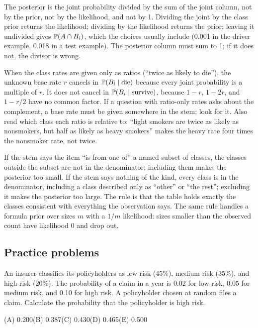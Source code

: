 \begin{trap}
The posterior is the joint probability divided by the sum of the joint column, not by the
prior, not by the likelihood, and not by 1. Dividing the joint by the class prior returns the
likelihood; dividing by the likelihood returns the prior; leaving it undivided gives
$\mathbb{P}(A \cap B_i)$, which the choices usually include (0.001 in the driver example, 0.018 in
a test example). The posterior column must sum to 1; if it does not, the divisor is wrong.
\end{trap}

\begin{trap}
When the class rates are given only as ratios (``twice as likely to die''), the unknown base
rate $r$ cancels in $\mathbb{P}(B_i \mid \text{die})$ because every joint probability is a
multiple of $r$. It does not cancel in $\mathbb{P}(B_i \mid \text{survive})$, because
$1 - r$, $1 - 2r$, and $1 - r/2$ have no common factor. If a question with ratio-only
rates asks about the complement, a base rate must be given somewhere in the stem; look for
it. Also read which class each ratio is relative to: ``light smokers are twice as likely as
nonsmokers, but half as likely as heavy smokers'' makes the heavy rate four times the
nonsmoker rate, not twice.
\end{trap}

\begin{trap}
If the stem says the item ``is from one of'' a named subset of classes, the classes outside
the subset are not in the denominator; including them makes the posterior too small. If the
stem says nothing of the kind, every class is in the denominator, including a class described
only as ``other'' or ``the rest''; excluding it makes the posterior too large. The rule is
that the table holds exactly the classes consistent with everything the observation says.
The same rule handles a formula prior over sizes $m$ with a $1/m$ likelihood: sizes
smaller than the observed count have likelihood 0 and drop out.
\end{trap}

\subsection{Practice problems}

\begin{practice}
An insurer classifies its policyholders as low risk (45\%), medium risk (35\%), and high
risk (20\%). The probability of a claim in a year is 0.02 for low risk, 0.05 for medium
risk, and 0.10 for high risk. A policyholder chosen at random files a claim. Calculate the
probability that the policyholder is high risk.
\par\smallskip\noindent (A) 0.200\qquad (B) 0.387\qquad (C) 0.430\qquad (D) 0.465\qquad (E) 0.500
\end{practice}

